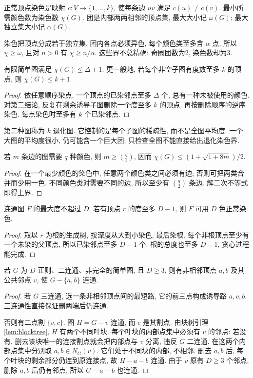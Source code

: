 \label{ch:coloring}
\begin{definition}
正常顶点染色是映射 $c:V\to\{1,\ldots,k\}$, 使每条边 $uv$ 满足 $c(u)\ne c(v)$. 最小所需颜色数为染色数 $\chi(G)$. 团是内部两两相邻的顶点集, 最大大小记 $\omega(G)$; 最大独立集大小记 $\alpha(G)$.
\end{definition}
染色把顶点分成若干独立集. 团内各点必须异色, 每个颜色类至多含 $\alpha$ 点, 所以 $\chi\ge\omega$, 且对 $n>0$ 有 $\chi\ge n/\alpha$. 这些界不总精确: 奇圈团数为2, 染色数却为3.
\begin{proposition}\label{prop:greedycolor}
有限简单图满足 $\chi(G)\le\Delta+1$. 更一般地, 若每个非空子图有度数至多 $k$ 的顶点, 则 $\chi(G)\le k+1$.
\end{proposition}
\begin{proof}
依任意顺序染点, 一个顶点的已染邻点至多 $\Delta$ 个, 总有一种未被使用的颜色. 对第二结论, 反复在剩余诱导子图删除一个度至多 $k$ 的顶点, 再按删除顺序的逆序染色. 每点染色时至多有 $k$ 个已染邻点.
\end{proof}
第二种图称为 $k$ 退化图. 它控制的是每个子图的稀疏性, 而不是全图平均度. 一个大图的平均度很小, 仍可能含一个巨大团; 只检查全图不能直接给出退化染色界.
\begin{proposition}
若 $m$ 条边的图需要 $q$ 种颜色, 则 $m\ge\binom q2$, 因而 $\chi(G)\le (1+\sqrt{1+8m})/2$.
\end{proposition}
\begin{proof}
在一个最少颜色的染色中, 任意两个颜色类之间必须有边; 否则可把两类合并而少用一色. 不同颜色类对需要不同的边, 所以至少有 $\binom q2$ 条边. 解二次不等式即得上界.
\end{proof}
\begin{lemma}\label{lem:lowdegreecolor}
连通图 $F$ 的最大度不超过 $D$. 若有顶点 $r$ 的度至多 $D-1$, 则 $F$ 可用 $D$ 色正常染色.
\end{lemma}
\begin{proof}
取以 $r$ 为根的生成树, 按深度从大到小染色, 最后染根. 每个非根顶点至少有一个未染的父顶点, 所以已染邻点至多 $D-1$ 个. 根的总度也至多 $D-1$, 贪心过程能完成.
\end{proof}
\begin{lemma}\label{lem:brooksorder}
若 $G$ 为 $D$ 正则、二连通、非完全的简单图, 且 $D\ge3$, 则有非相邻顶点 $a,b$ 及其公共邻点 $v$, 使 $G-\{a,b\}$ 连通.
\end{lemma}
\begin{proof}
若 $G$ 三连通, 选一条非相邻顶点间的最短路, 它的前三点构成诱导路 $a,v,b$. 三连通性直接保证删两端后仍连通.

否则有二点割 $\{v,c\}$. 图 $H=G-v$ 连通, 而 $c$ 是其割点. 由块树引理\ref{lem:blocktree}, $H$ 有两个不同叶块. 每个叶块的内部点集中必须有 $v$ 的邻点: 若没有, 删去该块唯一的连接割点就会把内部点与 $v$ 分离, 违反 $G$ 二连通. 在这两个内部点集中分别取 $a,b\in N_G(v)$. 它们处于不同块的内部, 不相邻. 删去 $a,b$ 后, 每个叶块的剩余部分仍连到原连接点, 故 $H-a-b$ 连通. 由于 $v$ 原有 $D\ge3$ 个邻点, 删除 $a,b$ 后仍有邻点, 所以 $G-a-b$ 也连通.
\end{proof}
